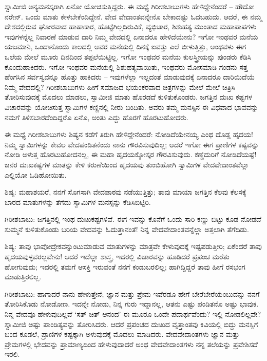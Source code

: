 ಸ್ವಾಮೀಜಿ ಅನ್ಯಮನಸ್ಕರಾಗಿ ಏನೋ ಯೋಚಿಸುತ್ತಿದ್ದರು. ಈ ಮಧ್ಯೆ ಗಿರೀಶಬಾಬುಗಳು ಹೇಳಿದ್ದೇನೆಂದರೆ – ಹೌದೋ ನರೇನ್. ಒಂದು ಮಾತು ಕೇಳಬೇಕೆಂದಿದ್ದೇನೆ. ವೇದ ವೇದಾಂತವನ್ನೇನೊ ಬೇಕಾದಷ್ಟು ಓದಬಹುದು. ಆದರೆ, ಈ ನಮ್ಮ ದೇಶದಲ್ಲಿರುವ ಘೋರವಾದ ಹಾಹಾಕಾರ, ಹೊಟ್ಟೆಗಿಲ್ಲದಿರುವಿಕೆ, ವ್ಯಭಿಚಾರ, ಶಿಶುಹತ್ಯ ಮುಂತಾದ ಮಹಾಪಾಪಗಳು ಇವುಗಳನ್ನೆಲ್ಲ ನಿವಾರಣೆ ಮಾಡುವ ದಾರಿ ನಿಮ್ಮ ವೇದದಲ್ಲಿ ಏನಾದರೂ ಹೇಳಿದೆಯೇನು? ಇಗೋ ಇಂಥವರ ಮನೆಯ ಯಜಮಾನಿ, ಒಂದಾನೊಂದು ಕಾಲದಲ್ಲಿ ಅವರ ಮನೆಯಲ್ಲಿ ದಿನಕ್ಕೆ ಐವತ್ತು ಎಲೆ ಬೀಳುತ್ತಿತ್ತು, ಅಂಥವಳು ಈಗ ಒಲೆಯ ಮೇಲೆ ಮೂರು ದಿನದಿಂದ ತಪ್ಪಲೆಯಿಟ್ಟಿಲ್ಲ. ಇಗೋ ಇಂಥವರ ಮನೆಯ ಕುಲಸ್ತ್ರೀಯನ್ನು ಪುಂಡರು ಕೆಡಿಸಿ ಕೊಂದುಹಾಕಿದರು. ಇಗೋ ಇಂಥವರ ಮನೆಯಲ್ಲಿ ಶಿಶುಹತ್ಯವಾಯಿತು, ಇಂಥವರು ಮೋಸಮಾಡಿ ಗಂಡನು ಸತ್ತ ಹೆಂಗಸಿನ ಸರ್ವಸ್ವವನ್ನೂ ಹೊತ್ತು ಹಾಕಿದರು – ಇವುಗಳೆಲ್ಲಾ ಇಲ್ಲದಂತೆ ಮಾಡುವುದಕ್ಕೆ ಏನಾದರೂ ದಾರಿಯಿದೆಯೆ ನಿಮ್ಮ ವೇದದಲ್ಲಿ? ಗಿರೀಶಬಾಬುಗಳು ಹೀಗೆ ಸಮಾಜದ ಭಯಂಕರವಾದ ಚಿತ್ರಗಳನ್ನು ಮೇಲೆ ಮೇಲೆ ಚಿತ್ರಿಸಿ ತೋರಿಸುವುದಕ್ಕೆ ಮೊದಲು ಮಾಡಲು, ಸ್ವಾಮೀಜಿ ಮಾತು ಹೊರಡದೆ ಕುಳಿತುಕೊಂಡರು. ಜಗತ್ತಿನ ದುಃಖ ಕಷ್ಟಗಳ ವಿಚಾರವನ್ನು ಯೋಚಿಸುತ್ತ ಸ್ವಾಮಿಗಳ ಕಣ್ಣಿನಲ್ಲಿ ನೀರು ಬಂದಿತು. ಅವರು ತಮ್ಮ ಮನಸ್ಸಿನ ಈ ವಿಧವಾದ ಭಾವವನ್ನು ನಮಗೆ ತಿಳಿಸಬಾರದೆಂದಿದ್ದರೊ ಏನೊ, ಅಂತು ಎದ್ದು ಹೊರಗೆ ಹೊರಟುಹೋದರು.

ಈ ಮಧ್ಯೆ ಗಿರೀಶಬಾಬುಗಳು ಶಿಷ್ಯನ ಕಡೆಗೆ ತಿರುಗಿ ಹೇಳಿದ್ದೇನೆಂದರೆ: ನೋಡಿದೆಯೇನಯ್ಯ ಎಂಥ ದೊಡ್ಡ ಹೃದಯ! ನಿಮ್ಮ ಸ್ವಾಮಿಗಳನ್ನು ಕೇವಲ ವೇದಪಂಡಿತನೆಂದು ನಾನು ಗೌರವಿಸುವುದಿಲ್ಲ; ಆದರೆ ಇಗೋ ಈಗ ಪ್ರಾಣಿಗಳ ಕಷ್ಟವನ್ನು ನೋಡಿ ಅಳುತ್ತ ಹೊರಟುಹೋದನಲ್ಲ, ಈ ಮಹಾ ಹೃದಯಕ್ಕೋಸ್ಕರ ಗೌರವಿಸುವುದು. ಕಣ್ಣೆದುರಿಗೆ ನೋಡಿದೆಯಷ್ಟೆ! ಜನರ ದುಃಖಕಷ್ಟಗಳ ಮಾತನ್ನು ಕೇಳಿ ಕರುಣೆಯಿಂದ ಹೃದಯವು ತುಂಬಿಹೋಗಿ ಸ್ವಾಮಿಗಳ ವೇದವೇದಾಂತವೆಲ್ಲಾ ಎಲ್ಲಿಯೋ ಓಡಿಹೋಯಿತು.

ಶಿಷ್ಯ: ಮಹಾಶಯರೆ, ನನಗೆ ಸೊಗಸಾಗಿ ವೇದಪಾಠವು ನಡೆಯುತ್ತಿತ್ತು; ತಾವು ಮಾಯಾ ಜಗತ್ತಿನ ಕೆಲವು ಕೆಲಸಕ್ಕೆ ಬಾರದ ಮಾತುಗಳನ್ನು ತೆಗೆದು ಸ್ವಾಮಿಗಳ ಮನಸ್ಸನ್ನು ಕೆಡಿಸಿಬಿಟ್ಟಿರಿ.

ಗಿರೀಶಬಾಬು: ಜಗತ್ತಿನಲ್ಲಿ ಇಂಥ ದುಃಖಕಷ್ಟಗಳಿವೆ. ಈಗ ಇವನ್ನು ಕೊನೆಗೆ ಒಂದು ಸಾರಿ ಕಣ್ಣು ಬಿಟ್ಟು ಕೂಡ ನೋಡದೆ ಸುಮ್ಮನೆ ಕುಳಿತುಕೊಂಡು ಬರಿಯ ವೇದವನ್ನು ಓದುತ್ತಾನಂತೆ! ನಿನ್ನ ವೇದವೇದಾಂತವನ್ನೆಲ್ಲಾ ಅತ್ತಲಾಗಿ ತೆಗೆದಿಡು.

ಶಿಷ್ಯ: ತಾವು ಭಾವೋದ್ರೇಕವನ್ನುಂಟುಮಾಡುವ ಮಾತುಗಳನ್ನು ಮಾತ್ರವೇ ಕೇಳುವುದಕ್ಕೆ ಇಷ್ಟಪಡುತ್ತೀರಿ; ಏಕೆಂದರೆ ತಾವು ಹೃದಯವುಳ್ಳವರಲ್ಲವೇನು! ಆದರೆ ಇದೆಲ್ಲಾ ಶಾಸ್ತ್ರ, ಇದರಲ್ಲಿ ವಿಚಾರವನ್ನು ಹೂಡಿದರೆ ಪ್ರಪಂಚ ಮರೆತು ಹೋಗುವುದು; ಇದರಲ್ಲಿ ತಮಗೆ ಆಸಕ್ತಿ ಇರುವಂತೆ ನನಗೆ ಕಂಡುಬರಲಿಲ್ಲ; ಹಾಗಿದ್ದಿದ್ದರೆ ತಾವು ಹೀಗೆ ರಸಭಂಗ ಮಾಡುತ್ತಿರಲಿಲ್ಲ.

ಗಿರೀಶಬಾಬು: ಹಾಗಾದರೆ ನಾನು ಹೇಳುತ್ತೇನೆ; ಜ್ಞಾನ ಮತ್ತು ಪ್ರೇಮ ಇವೆರಡೂ ಹೇಗೆ ಬೇರೆಬೇರೆಯೆಂಬುದನ್ನು ನನಗೆ ತೋರಿಸಿಕೊಡು ನೋಡೋಣ. ಇದನ್ನೇ ನೋಡು, ನಿನ್ನ ಗುರು ಇದ್ದಾನಲ್ಲ, ಆತನು ಎಷ್ಟು ಪಂಡಿತನೊ ಅಷ್ಟು ಭಾವುಕ. ನಿನ್ನ ವೇದವೂ ಹೇಳುವುದಿಲ್ಲವೆ ‘ಸತ್ ಚಿತ್ ಆನಂದ’ ಈ ಮೂರೂ ಒಂದೇ ಪದಾರ್ಥವೆಂದು? ಇಲ್ಲಿ ನೋಡಲಿಲ್ಲವೇ? ಸ್ವಾಮೀಜಿ ಅಷ್ಟು ಪಾಂಡಿತ್ಯವನ್ನು ತೋರಿಸಿದರು. ಆದರೆ ಪ್ರಪಂಚದ ದುಃಖದ ವೃತ್ತಾಂತವು ಕಿವಿಯಲ್ಲಿ ಬಿದ್ದು ಮನಸ್ಸಿಗೆ ಬಂದ ಕೂಡಲೆ, ಪ್ರಾಣಿಗಳ ಕಷ್ಟಕ್ಕಾಗಿ ಅಳುವುದಕ್ಕೆ ಮೊದಲು ಮಾಡಿದರು. ವೇದವೇದಾಂತಗಳು ಜ್ಞಾನ ಮತ್ತು ಪ್ರೇಮಗಳಲ್ಲಿ ಭೇದವನ್ನು ಪ್ರಾಮಾಣ್ಯದಿಂದ ಹೇಳುವುದಾದರೆ ಅಂಥ ವೇದವೇದಾಂತಗಳು ನನ್ನ ತಲೆಯನ್ನು ಪ್ರವೇಶಿಸದೆ ಇರಲಿ.


